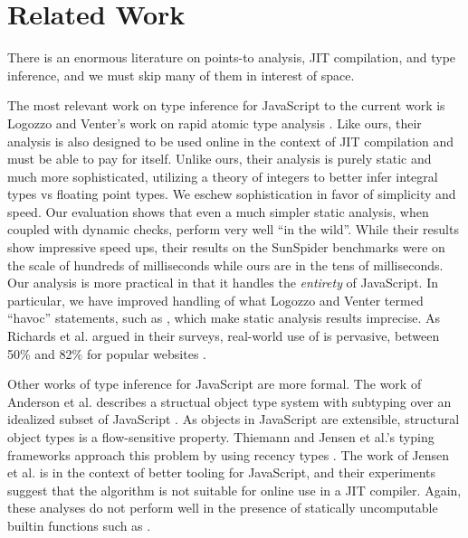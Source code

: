 \section{Related Work}

There is an enormous literature on points-to analysis, JIT compilation, and
type inference, and we must skip many of them in interest of space.

The most relevant work on type inference for JavaScript to the current work is
Logozzo and Venter's work on rapid atomic type analysis \cite{Logozzo10}.
Like ours, their analysis is also designed to be used online in the context of
JIT compilation and must be able to pay for itself. Unlike ours, their
analysis is purely static and much more sophisticated, utilizing a theory of
integers to better infer integral types vs floating point types. We eschew
sophistication in favor of simplicity and speed. Our evaluation shows that
even a much simpler static analysis, when coupled with dynamic checks, perform
very well ``in the wild''. While their results show impressive speed ups,
their results on the SunSpider benchmarks were on the scale of hundreds of
milliseconds while ours are in the tens of milliseconds. Our analysis is more
practical in that it handles the \emph{entirety} of JavaScript. In particular,
we have improved handling of what Logozzo and Venter termed ``havoc''
statements, such as , which make static analysis results
imprecise. As Richards et al. argued in their surveys, real-world use of
 is pervasive, between 50\% and 82\% for popular websites
\cite{Richards11, Richards10}.

Other works of type inference for JavaScript are more formal. The work of
Anderson et al. describes a structual object type system with subtyping over
an idealized subset of JavaScript \cite{Anderson05}. As objects in JavaScript
are extensible, structural object types is a flow-sensitive property. Thiemann
and Jensen et al.'s typing frameworks approach this problem by using recency
types \cite{Thiemann05, Jensen09}. The work of Jensen et al. is in the context
of better tooling for JavaScript, and their experiments suggest that the
algorithm is not suitable for online use in a JIT compiler. Again, these
analyses do not perform well in the presence of statically uncomputable
builtin functions such as .

